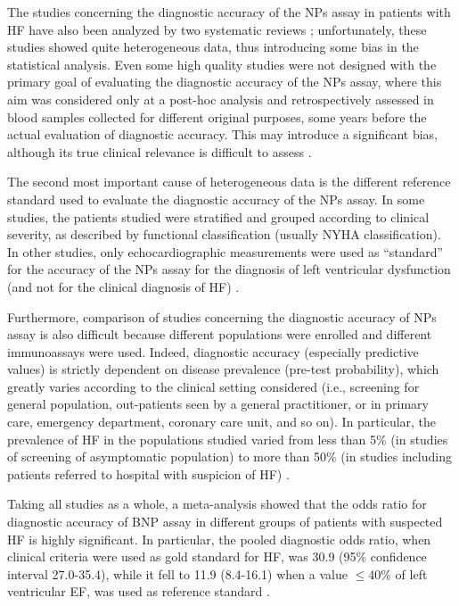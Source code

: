\documentclass[14pt,a4paper,onecolumn]{extarticle}
\begin{document}
The studies concerning the diagnostic accuracy of the NPs assay in patients with HF have also been analyzed by two systematic reviews \citep{bib35} \citep{bib372}; unfortunately, these studies showed quite heterogeneous data, thus introducing some bias in the statistical analysis. Even some high quality studies were not designed with the primary goal of evaluating the diagnostic accuracy of the NPs assay, where this aim was considered only at a post-hoc analysis and retrospectively assessed in blood samples collected for different original purposes, some years before the actual evaluation of diagnostic accuracy. This may introduce a significant bias, although its true clinical relevance is difficult to assess \citep{bib35}.



The second most important cause of heterogeneous data is the different reference standard used to evaluate the diagnostic accuracy of the NPs assay. In some studies, the patients studied were stratified and grouped according to clinical severity, as described by functional classification (usually NYHA classification). In other studies, only echocardiographic measurements were used as “standard” for the accuracy of the NPs assay for the diagnosis of left ventricular dysfunction (and not for the clinical diagnosis of HF) \citep{bib372}.



Furthermore, comparison of studies concerning the diagnostic accuracy of NPs assay is also difficult because different populations were enrolled and different immunoassays were used. Indeed, diagnostic accuracy (especially predictive values) is strictly dependent on disease prevalence (pre-test probability), which greatly varies according to the clinical setting considered (i.e., screening for general population, out-patients seen by a general practitioner, or in primary care, emergency department, coronary care unit, and so on). In particular, the prevalence of HF in the populations studied varied from less than 5\% (in studies of screening of asymptomatic population) to more than 50\% (in studies including patients referred to hospital with suspicion of HF) \citep{bib35}.


Taking all studies as a whole, a meta-analysis showed that the odds ratio for diagnostic accuracy of BNP assay in different groups of patients with suspected HF is highly significant. In particular, the pooled diagnostic odds ratio, when clinical criteria were used as gold standard for HF, was 30.9 (95\% confidence interval 27.0-35.4), while it fell to 11.9 (8.4-16.1) when a value $\leq$40\% of left ventricular EF, was used as reference standard \citep{bib372}.
\end{document}
